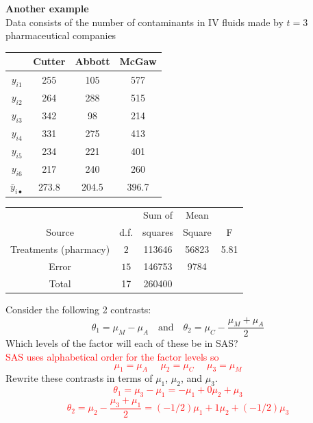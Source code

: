 \newpage

\textbf{Another example}\\
Data consists of the number of contaminants in IV fluids made by $t=3$ pharmaceutical companies
\begin{center}
\begin{tabular}{c|ccc|} \hline
&Cutter & Abbott & McGaw \\ \hline
$y_{i1}$&255 & 105 & 577 \\
$y_{i2}$&264 & 288 & 515 \\
$y_{i3}$&342 & 98 & 214 \\
$y_{i4}$&331 & 275 & 413 \\
$y_{i5}$&234 & 221 & 401 \\
$y_{i6}$&217 & 240 & 260 \\ \hline
$\bar{y}_{i\bullet}$ &273.8 & 204.5 & 396.7 \\ \hline
\end{tabular}
\end{center}
\begin{center}
\begin{tabular}{|c|c|c|c|c|}  \hline
& & Sum of & Mean & \\
Source & d.f. & squares & Square & F \\ \hline
Treatments (pharmacy) & $2$ & 113646 & 56823 & 5.81\\
Error & $15$ & 146753 & 9784 & \\
Total & 17 & 260400 & & \\ \hline
\end{tabular}
\end{center}
Consider the following 2 contrasts:
$$ \theta_1 = \mu_M-\mu_A \ \ \ \mbox{ and }\ \ \ \theta_2=\mu_C-\frac{\mu_M+\mu_A}{2}$$
Which levels of the factor will each of these be in SAS? %
\\\textcolor{red}{SAS uses alphabetical order for the factor levels so
$$\mu_1=\mu_{A}~~~~~~\mu_2=\mu_{C}~~~~~~\mu_3=\mu_{M}$$}
Rewrite these contrasts in terms of $\mu_1$, $\mu_2$, and $\mu_3$.%
\textcolor{red}{
$$\theta_1 = \mu_3-\mu_1=-\mu_1+0\mu_2+\mu_3$$
$$\theta_2 = \mu_2-\frac{\mu_3+\mu_1}{2}=(-1/2)\mu_1+1\mu_2+(-1/2)\mu_3$$
}
